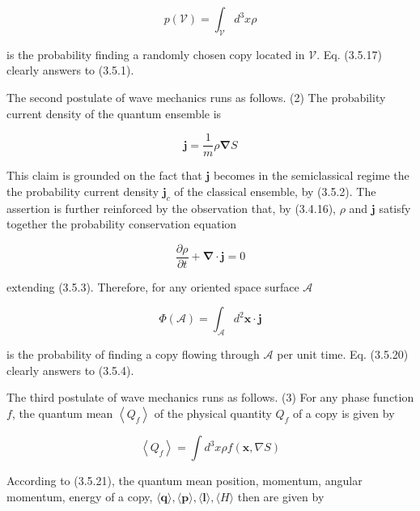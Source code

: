\documentclass{article}
\begin{document}
\begin{equation*}
p(\mathcal{V})=\int_{\mathcal{V}} d^{3} x \rho \tag{3.5.17}
\end{equation*}
 
is the probability finding a randomly chosen copy located in $\mathcal{V}$. Eq. (3.5.17) clearly answers to (3.5.1).

The second postulate of wave mechanics runs as follows.
(2) The probability current density of the quantum ensemble is
 
\begin{equation*}
\boldsymbol{j}=\frac{1}{m} \rho \boldsymbol{\nabla} S \tag{3.5.18}
\end{equation*}
 

This claim is grounded on the fact that $\boldsymbol{j}$ becomes in the semiclassical regime the the probability current density $\boldsymbol{j}_{c}$ of the classical ensemble, by (3.5.2). The assertion is further reinforced by the observation that, by (3.4.16), $\rho$ and $\boldsymbol{j}$ satisfy together the probability conservation equation
 
\begin{equation*}
\frac{\partial \rho}{\partial t}+\boldsymbol{\nabla} \cdot \boldsymbol{j}=0 \tag{3.5.19}
\end{equation*}
 
extending (3.5.3). Therefore, for any oriented space surface $\mathcal{A}$
 
\begin{equation*}
\Phi(\mathcal{A})=\int_{\mathcal{A}} d^{2} \boldsymbol{x} \cdot \boldsymbol{j} \tag{3.5.20}
\end{equation*}
 
is the probability of finding a copy flowing through $\mathcal{A}$ per unit time. Eq. (3.5.20) clearly answers to (3.5.4).

The third postulate of wave mechanics runs as follows.
(3) For any phase function $f$, the quantum mean $\left\langle Q_{f}\right\rangle$ of the physical quantity $Q_{f}$ of a copy is given by
 
\begin{equation*}
\left\langle Q_{f}\right\rangle=\int d^{3} x \rho f(\boldsymbol{x}, \nabla S) \tag{3.5.21}
\end{equation*}
 

According to (3.5.21), the quantum mean position, momentum, angular momentum, energy of a copy, $\langle\boldsymbol{q}\rangle,\langle\boldsymbol{p}\rangle,\langle\boldsymbol{l}\rangle,\langle H\rangle$ then are given by
 
\end{document}
